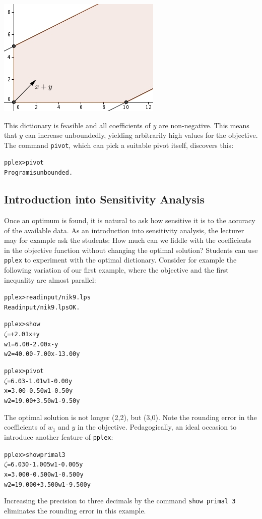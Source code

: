 \documentclass[ukenglish,a4]{article}
\begin{document}
\vspace{.2cm}
\begin{minipage}{.55\textwidth}
\begin{alltt}

\end{alltt}
\end{minipage}
\begin{minipage}{.45\textwidth}
	\includegraphics{ex_unbound.jpg}
\end{minipage}
This dictionary is feasible and all coefficients of $y$ are non-negative. 
This means that $y$ can increase unboundedly, 
yielding arbitrarily high values for the objective.
The command \verb|pivot|, which can pick a suitable pivot itself,
discovers this:
\begin{alltt}
pplex> pivot
Program is unbounded.
\end{alltt}

\subsection{Introduction into Sensitivity Analysis}

Once an optimum is found, it is natural to ask how sensitive it is to the accuracy of the available data. 
As an introduction into sensitivity analysis, the lecturer may for example ask the students: 
How much can we fiddle with the coefficients in the objective function without changing the optimal solution?
Students can use \texttt{pplex} to experiment with the optimal dictionary.
Consider for example the following variation of our first example,
where the objective and the first inequality are almost parallel:
\begin{alltt}
pplex> read input/nik9.lps
Read input/nik9.lps OK.

pplex> show        
 \(\zeta\) =       + 2.01x +      y
w1 =  6.00 - 2.00x -      y
w2 = 40.00 - 7.00x - 13.00y

pplex> pivot
 \(\zeta\) =  6.03 - 1.01w1 - 0.00y
 x =  3.00 - 0.50w1 - 0.50y
w2 = 19.00 + 3.50w1 - 9.50y
\end{alltt}
The optimal solution is not longer (2,2), but (3,0). 
Note the rounding error in the coefficients of $w_1$ and $y$ in the objective.
Pedagogically, an ideal occasion to introduce another feature of \texttt{pplex}: 
\begin{alltt}
pplex> show primal 3
 \(\zeta\) =  6.030 - 1.005w1 - 0.005y
 x =  3.000 - 0.500w1 - 0.500y
w2 = 19.000 + 3.500w1 - 9.500y
\end{alltt}
Increasing the precision to three decimals by the command \texttt{show primal 3} eliminates the rounding error in this example.
\end{document}
